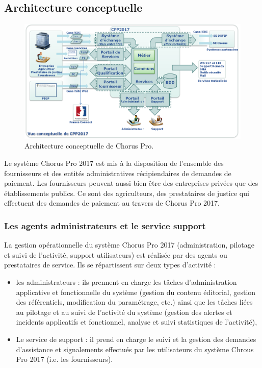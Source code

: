 \documentclass[12pt,a4paper]{article}
\begin{document}
\subsection{Architecture conceptuelle}
\begin{figure}[H]
	\begin{center}
		\includegraphics[width=\textwidth, height=\textheight, keepaspectratio]{archiConceptuelle.png}
		\caption{Architecture conceptuelle de Chorus Pro.}
	\end{center}
\end{figure}
Le système Chorus Pro 2017 est mis à la disposition de l’ensemble des fournisseurs et des entités administratives récipiendaires de demandes de paiement. Les fournisseurs peuvent aussi bien être des entreprises privées que des établissements publics. Ce sont des agriculteurs, des prestataires de justice qui effectuent des demandes de paiement au travers de Chorus Pro 2017.
\subsubsection{Les agents administrateurs et le service support}
La gestion opérationnelle du système Chorus Pro 2017 (administration, pilotage et suivi de l’activité, support utilisateurs) est réalisée par des agents ou prestataires de service. Ils se répartissent sur deux types d’activité : 
\begin{itemize}
\item les administrateurs : ils prennent en charge les tâches d’administration applicative et fonctionnelle du système (gestion du contenu éditorial, gestion des référentiels, modification du paramétrage, etc.) ainsi que les tâches liées au pilotage et au suivi de l’activité du système (gestion des alertes et incidents applicatifs et fonctionnel, analyse et suivi statistiques de l’activité),
\item Le service de support : il prend en charge le suivi et la gestion des demandes d’assistance et signalements effectués par les utilisateurs du système Chrous Pro 2017 (i.e. les fournisseurs).
\end{itemize}
\end{document}
